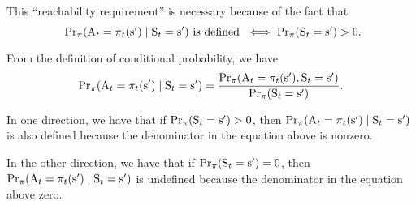 \documentclass{rl_theory/note}
\begin{document}
\begin{note}
  This ``reachability requirement'' is necessary
  because of the fact that
  $$\text{ 
  $
  {\rm Pr}_{\pi}({\rm A}_t = \pi_t({\rm s}') \mid {\rm S}_t = {\rm s}')$ 
  is defined } 
  \iff 
  {\rm Pr}_{\pi}({\rm S}_{t} = {\rm s}') > 0
  .$$%

  From the definition of conditional probability, we have
  $$ 
  {\rm Pr}_{\pi}({\rm A}_t = \pi_t({\rm s}') \mid {\rm S}_t = {\rm s}')
  = 
  \frac
  {{\rm Pr}_{\pi}({\rm A}_t = \pi_t({\rm s}'), {\rm S}_t = {\rm s}')}
  {{\rm Pr}_{\pi}({\rm S}_t = {\rm s}')}.$$

  In one direction, we have that if ${\rm Pr}_{\pi}({\rm S}_t = {\rm s}') > 0$, then 
  $ {\rm Pr}_{\pi}({\rm A}_t = \pi_t({\rm s}') \mid {\rm S}_t = {\rm s}') $
  is also defined because the denominator in the equation above is nonzero.

  In the other direction, we have that if ${\rm Pr}_{\pi}({\rm S}_t = {\rm s}') = 0$, then 
  $ {\rm Pr}_{\pi}({\rm A}_t = \pi_t({\rm s}') \mid {\rm S}_t = {\rm s}') $
  is undefined because the denominator in the equation above zero.
\end{note}
\end{document}
